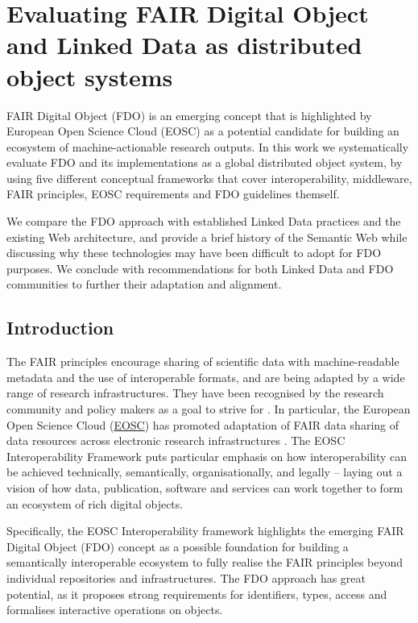 \section{Evaluating FAIR Digital Object and Linked Data as distributed object systems}\label{ch3:evaluating-fdo-ld}

FAIR Digital Object (FDO) is an emerging concept that is highlighted by European Open Science Cloud (EOSC) as a potential candidate for building an ecosystem of machine-actionable research outputs. In this work we systematically evaluate FDO and its implementations as a global distributed object system, by using five different conceptual frameworks that cover interoperability, middleware, FAIR principles, EOSC requirements and FDO guidelines themself.

We compare the FDO approach with established Linked Data practices and the existing Web architecture, and provide a brief history of the Semantic Web while discussing why these technologies may have been difficult to adopt for FDO purposes. We conclude with recommendations for both Linked Data and FDO communities to further their adaptation and alignment.

\subsection{Introduction}\label{ch3:introduction}

The FAIR principles \cite{Wilkinson 2016} encourage sharing of scientific data with machine-readable metadata and the use of interoperable formats, and are being adapted by a wide range of research infrastructures. They have been recognised by the research community and policy makers as a goal to strive for \cite{h2020fair2016}. In particular, the European Open Science Cloud (\href{https://www.eosc.eu/}{EOSC}) has promoted adaptation of FAIR data sharing of data resources across electronic research infrastructures \cite{Mons 2017}. The EOSC Interoperability Framework \cite{eosc-interop-framework} puts particular emphasis on how interoperability can be achieved technically, semantically, organisationally, and legally -- laying out a vision of how data, publication, software and services can work together to form an ecosystem of rich digital objects.

Specifically, the EOSC Interoperability framework highlights the emerging FAIR Digital Object (FDO) concept \cite{schultesFAIRPrinciplesDigital2019a} as a possible foundation for building a semantically interoperable ecosystem to fully realise the FAIR principles beyond individual repositories and infrastructures. The FDO approach has great potential, as it proposes strong requirements for identifiers, types, access and formalises interactive operations on objects.

